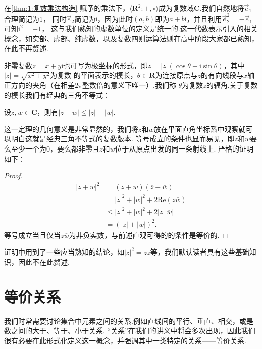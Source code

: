 在\autoref{thm:1:复数乘法构造} 赋予的乘法下，$\langle\mathbf{R}^2:+,\circ\rangle$成为复数域$\mathbf{C}$.我们自然地将$\vec{e}_1$合理简记为1，
同时$\vec{e}_2$简记为$\mathrm{i}$，因为此时$(a,b)$即为$a+b\mathrm{i}$，并且利用$\vec{e}_2^2=-\vec{e}_1$可知$\mathrm{i}^2=-1$，
这与我们熟知的虚数单位的定义是统一的.这一代数表示引入的相关概念，如实部、虚部、纯虚数，以及复数四则运算法则在高中阶段大家都已熟知，在此不再赘述.

非零复数$z=x+y\mathrm{i}$也可写为极坐标的形式，即$z=|z|(\cos\theta+\mathrm{i}\sin\theta)$，其中$|z|=\sqrt{x^2+y^2}$为复数
的平面表示的模长，$\theta\in\mathbf{R}$为连接原点与$z$的有向线段与$x$轴正方向的夹角（在相差$2\pi$整数倍的意义下唯一）.我们称
$\theta$为复数$z$的辐角.关于复数的模长我们有经典的三角不等式：
\begin{theorem}
    设$z,w\in\mathbf{C}$，则有$|z+w|\leqslant|z|+|w|$.
\end{theorem}

这一定理的几何意义是非常显然的，我们将$z$和$w$放在平面直角坐标系中观察就可以明白这就是经典三角不等式的复数版本.
等号成立的条件也显而易见，即$z$和$w$要么至少一个为0，要么都非零且$z$和$w$位于从原点出发的同一条射线上.
严格的证明如下：

\begin{proof}
    \begin{align*}
        |z+w|^2&=(z+w)(\overline{z}+\overline{w})\\
        &=|z|^2+|w|^2+2\mathrm{Re}(z\overline{w})\\
        &\leqslant|z|^2+|w|^2+2|z||\overline{w}|\\
        &=(|z|+|w|)^2.
    \end{align*}
    等号成立当且仅当$z\overline{w}$为非负实数，与前述直观可得的的条件是等价的.
\end{proof}

证明中用到了一些应当熟知的结论，如$|z|^2=z\overline{z}$等，我们默认读者具有这些基础知识，因此不在此赘述.

\section{等价关系}
我们时常需要讨论集合中元素之间的关系.例如直线间的平行、垂直、相交，或是数之间的大于、等于、小于关系.
``关系''在我们的讲义中将会多次出现，因此我们很有必要在此形式化定义这一概念，并强调其中一类特定的关系——等价关系.

